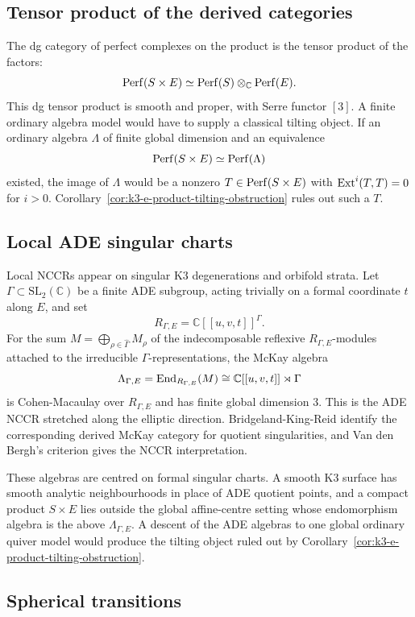 \subsection*{Tensor product of the derived categories}

The dg category of perfect complexes on the product is the tensor
product of the factors:
\[
  \mathrm{Perf}(S\times E)\simeq \mathrm{Perf}(S)\otimes_{\mathbb C}\mathrm{Perf}(E).
\]
This dg tensor product is smooth and proper, with Serre functor
\([3]\).  A finite ordinary algebra model would have to supply a
classical tilting object.  If an ordinary algebra \(\Lambda\) of finite
global dimension and an equivalence
\[
  \mathrm{Perf}(S\times E)\simeq \mathrm{Perf}(\Lambda)
\]
existed, the image of \(\Lambda\) would be a nonzero
\(T\in\mathrm{Perf}(S\times E)\) with \(\mathrm{Ext}^i(T,T)=0\) for \(i>0\).
Corollary~\ref{cor:k3-e-product-tilting-obstruction}
rules out such a \(T\).

\subsection*{Local ADE singular charts}

Local NCCRs appear on singular K3 degenerations and orbifold strata.
Let \(\Gamma\subset \mathrm{SL}_2(\mathbb C)\) be a finite ADE subgroup,
acting trivially on a formal coordinate \(t\) along \(E\), and set
\[
  R_{\Gamma,E}
  =
  \mathbb C[[u,v,t]]^\Gamma .
\]
For the sum \(M=\bigoplus_{\rho\in \widehat\Gamma} M_\rho\) of the
indecomposable reflexive \(R_{\Gamma,E}\)-modules attached to the
irreducible \(\Gamma\)-representations, the McKay algebra
\[
  \Lambda_{\Gamma,E}
  =
  \mathrm{End}_{R_{\Gamma,E}}(M)
  \cong
  \mathbb C[[u,v,t]]\rtimes \Gamma
\]
is Cohen-Macaulay over \(R_{\Gamma,E}\) and has finite global
dimension \(3\).  This is the ADE NCCR stretched along the elliptic
direction.  Bridgeland-King-Reid identify the corresponding derived
McKay category for quotient singularities, and Van den Bergh's
criterion gives the NCCR interpretation.

These algebras are centred on formal singular charts.  A smooth K3
surface has smooth analytic neighbourhoods in place of ADE quotient
points, and a compact product \(S\times E\) lies outside the global
affine-centre setting whose endomorphism algebra is the above
\(\Lambda_{\Gamma,E}\).  A descent of the ADE algebras to one global
ordinary quiver model would produce the tilting object ruled out by
Corollary~\ref{cor:k3-e-product-tilting-obstruction}.

\subsection*{Spherical transitions}

